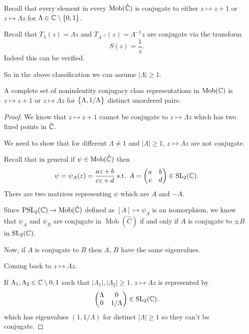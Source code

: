 \documentclass[11pt,a4paper]{article}
\DeclareMathOperator{\Mob}{Mob}
\begin{document}

Recall that every element in every $\Mob(\hat \C)$ is conjugate
to either $z \mapsto z + 1$ or $z \mapsto \Lambda z$ for
$\Lambda \in \mathbb{C} \setminus \left\{0,1\right\}$.

Recall that $T_{\lambda}(z)= \Lambda z$ and
$T_{\Lambda^{-1}}(z) = \Lambda^{-1} z$ are conjugate via the transform
\[
  S(z) = \frac{1}{z}.
\]
Indeed this can be verified.

So in the above classification we can assume $|\Lambda| \geq 1$.

\begin{corollary}
  A complete set of nonindentity conjugacy class representations in $\Mob(\C)$
  is $z \mapsto z + 1$ or $z \mapsto \Lambda z$ for $\left\{\Lambda, 1 / \Lambda\right\}$
  distinct unordered pairs.
\end{corollary}
\begin{proof}
  We know that $z \mapsto z + 1$ cannot be conjugate to $z \mapsto \Lambda z$
  which has two fixed points in $\hat {\mathbb{C}}$.

  We need to show that for different $\Lambda \neq 1$ and $|\Lambda| \geq 1$,
  $z \mapsto \Lambda z$ are not conjugate.

  Recall that in general if $\psi \in \Mob(\hat \C)$ then
  \[
    \psi = \psi_A(z) = \frac{a z + b}{c z + d} \text{ s.t. }
    A =
    \begin{pmatrix}
      a & b \\
      c & d
    \end{pmatrix} \in \mathrm{SL}_2(\mathbb{C}).
  \]
  There are two matrices representing $\psi$ which are $A$ and $-A$.

  Since $\PSL_2(\C) \to \Mob(\hat \C)$ defined as $[A] \mapsto \psi_A$
  is an isomorphism, we know that $\psi_A$ and $\psi_B$ are conjugate
  in $\Mob(\hat C)$ if and only if $A$ is conjugate to $\pm B$ in
  $\mathrm{SL}_2(\mathbb{C})$.

  Now, if $A$ is conjugate to $B$ then $A$, $B$ have the same eigenvalues.

  Coming back to $z \mapsto \Lambda z$.

  If $\Lambda_1, \Lambda_2 \in \mathbb{C} \setminus{0,1}$ such that
  $|\Lambda_1|, |\Lambda_2| \geq 1$. $z \mapsto \Lambda z$ is represented
  by
  \[
    \begin{pmatrix}
      \Lambda & 0 \\
      0 & 1 / \Lambda
    \end{pmatrix} \in \mathrm{SL}_2(\mathbb{C}).
  \]
  which has eigenvalues $(1, 1 / \Lambda)$ for distinct $|\Lambda| \geq 1$
  so they can't be conjugate.
\end{proof}
\end{document}
